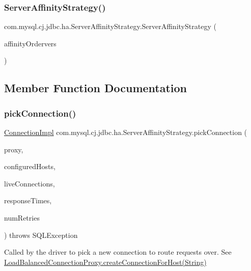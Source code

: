 \subsubsection{\texorpdfstring{Server\+Affinity\+Strategy()}{ServerAffinityStrategy()}}
{\footnotesize\ttfamily com.\+mysql.\+cj.\+jdbc.\+ha.\+Server\+Affinity\+Strategy.\+Server\+Affinity\+Strategy (\begin{DoxyParamCaption}\item[{String}]{affinity\+Ordervers }\end{DoxyParamCaption})}



\subsection{Member Function Documentation}
\mbox{\label{classcom_1_1mysql_1_1cj_1_1jdbc_1_1ha_1_1_server_affinity_strategy_adea6043b91b0a489e31de053e0f4cd25}} 
\subsubsection{\texorpdfstring{pick\+Connection()}{pickConnection()}}
{\footnotesize\ttfamily \mbox{\hyperlink{classcom_1_1mysql_1_1cj_1_1jdbc_1_1_connection_impl}{Connection\+Impl}} com.\+mysql.\+cj.\+jdbc.\+ha.\+Server\+Affinity\+Strategy.\+pick\+Connection (\begin{DoxyParamCaption}\item[{Invocation\+Handler}]{proxy,  }\item[{List$<$ String $>$}]{configured\+Hosts,  }\item[{Map$<$ String, \mbox{\hyperlink{interfacecom_1_1mysql_1_1cj_1_1jdbc_1_1_jdbc_connection}{Jdbc\+Connection}} $>$}]{live\+Connections,  }\item[{long \mbox{[}$\,$\mbox{]}}]{response\+Times,  }\item[{int}]{num\+Retries }\end{DoxyParamCaption}) throws S\+Q\+L\+Exception}

Called by the driver to pick a new connection to route requests over. See \mbox{\hyperlink{classcom_1_1mysql_1_1cj_1_1jdbc_1_1ha_1_1_load_balanced_connection_proxy_a27662d65e82acb86f3cc6af3f4f331ee}{Load\+Balanced\+Connection\+Proxy.\+create\+Connection\+For\+Host(\+String)}}


